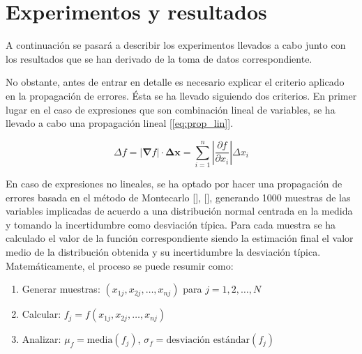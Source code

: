 \section{Experimentos y resultados}

A continuación se pasará a describir los experimentos llevados a cabo junto con los resultados que se han derivado de la toma de datos correspondiente.

\vspace{\baselineskip}

No obstante, antes de entrar en detalle es necesario explicar el criterio aplicado en la propagación de errores. Ésta se ha llevado siguiendo dos criterios. En primer lugar en el caso de expresiones que son combinación lineal de variables, se ha llevado a cabo una propagación lineal [\ref{eq:prop_lin}]. 

\vspace{\baselineskip}

\begin{equation}\label{eq:prop_lin}
	{\Delta f} = \left|\mathbf{\nabla}f\right|\cdot\mathbf{\Delta x} =  \sum_{i=1}^{n}\left|\frac{\partial f}{\partial x_i}\right|\Delta x_i
\end{equation}

\vspace{\baselineskip}

En caso de expresiones no lineales, se ha optado por hacer una propagación de errores basada en el método de Montecarlo [\cite{Anderson_montecarlo}], [\cite{montacarlo_python}], generando 1000 muestras de las variables implicadas de acuerdo a una distribución normal centrada en la medida y tomando la incertidumbre como desviación típica.  Para cada muestra se ha calculado el valor de la función correspondiente siendo la estimación final el valor medio de la distribución obtenida y su incertidumbre la desviación típica. Matemáticamente, el proceso se puede resumir como:

\begin{enumerate}
\item Generar muestras: \((x_{1j}, x_{2j}, \ldots, x_{nj})\) para \(j = 1, 2, \ldots, N\)
\item Calcular: \(f_j = f(x_{1j}, x_{2j}, \ldots, x_{nj})\)
\item Analizar: \(\mu_f = \text{media}(f_j)\), \(\sigma_f = \text{desviación estándar}(f_j)\)
\end{enumerate}

\vspace{\baselineskip}

